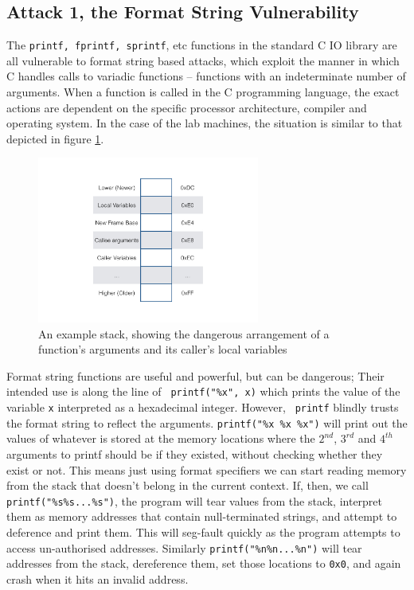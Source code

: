 \subsection{Attack 1, the Format String Vulnerability}

The {\tt printf, fprintf, sprintf}, etc functions in the standard C IO library are all vulnerable to format string based
attacks, which exploit the manner in which C handles calls to variadic functions\cite{vfunc} -- functions with an
indeterminate number of arguments. When a function is called in the C programming language,\cite{call_conv} the exact
actions are dependent on the specific processor architecture, compiler and operating system. In the case of the lab
machines, the situation is similar to that depicted in figure \ref{fig_stack}.

\begin{figure}[ht] \centering \includegraphics[width = 0.65\textwidth]{./images/stack.jpg} \caption{An example stack,
showing the dangerous arrangement of a function's arguments and its caller's local variables} \label{fig_stack}
\end{figure}

Format string functions are useful and powerful, but can be dangerous; Their intended use is along the line of {\tt
printf("\%x", x)} which prints the value of the variable {\tt x} interpreted as a hexadecimal integer. However, {\tt
printf} blindly trusts the format string to reflect the arguments. {\tt printf("\%x \%x \%x")} will print out the values
of whatever is stored at the memory locations where the $2^{nd}$, $3^{rd}$ and $4^{th}$ arguments to printf should be if
they existed, without checking whether they exist or not. This means just using format specifiers we can start reading
memory from the stack that doesn't belong in the current context. If, then, we call {\tt printf("\%s\%s...\%s")}, the
program will tear values from the stack, interpret them as memory addresses that contain null-terminated strings, and
attempt to deference and print them. This will seg-fault quickly as the program attempts to access un-authorised
addresses. Similarly {\tt printf("\%n\%n...\%n")} will tear addresses from the stack, dereference them, set those
locations to {\tt 0x0}, and again crash when it hits an invalid address.

